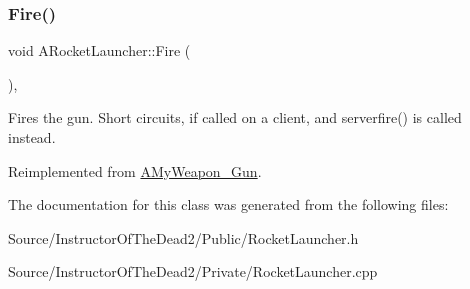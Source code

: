 \subsubsection{\texorpdfstring{Fire()}{Fire()}}
{\footnotesize\ttfamily void A\+Rocket\+Launcher\+::\+Fire (\begin{DoxyParamCaption}{ }\end{DoxyParamCaption})\hspace{0.3cm}{\ttfamily [override]}, {\ttfamily [virtual]}}

Fires the gun. Short circuits, if called on a client, and serverfire() is called instead. 

Reimplemented from \mbox{\hyperlink{class_a_my_weapon___gun_a8b430c2ea96f507fa29e2eceb7ebc552}{A\+My\+Weapon\+\_\+\+Gun}}.



The documentation for this class was generated from the following files\+:\begin{DoxyCompactItemize}
\item 
Source/\+Instructor\+Of\+The\+Dead2/\+Public/Rocket\+Launcher.\+h\item 
Source/\+Instructor\+Of\+The\+Dead2/\+Private/Rocket\+Launcher.\+cpp\end{DoxyCompactItemize}

